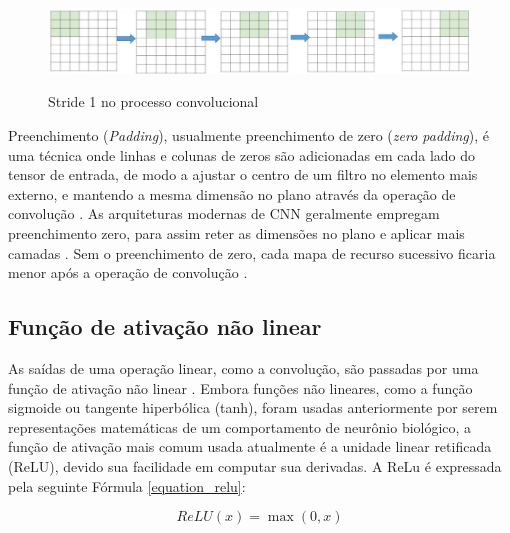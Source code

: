 \documentclass[
	12pt,				%
	oneside,			%
	a4paper,			%
	english,			%
	brazil				%
	]{abntex2ppgsi}
\begin{document}
\begin{figure}[H]
    \centering
    \caption{Stride 1 no processo convolucional}
    \includegraphics[scale=.40]{imagens/conceitos_basicos/convolution_stride_cnn.png}
    \label{fig:convolution_stride_cnn}
\end{figure}

Preenchimento (\textit{Padding}), usualmente preenchimento de zero (\textit{zero padding}), é uma técnica onde linhas e colunas de zeros são adicionadas em cada lado do tensor de entrada, de modo a ajustar o centro de um filtro no elemento mais externo, e mantendo a mesma dimensão no plano através da operação de convolução \cite{yamashita2018convolutional}. As arquiteturas modernas de CNN geralmente empregam preenchimento zero, para assim reter as dimensões no plano e aplicar mais camadas \cite{yamashita2018convolutional}. Sem o preenchimento de zero, cada mapa de recurso sucessivo ficaria menor após a operação de convolução \cite{yamashita2018convolutional}.

\subsection{Função de ativação não linear}
As saídas de uma operação linear, como a convolução, são passadas por uma função de ativação não linear \cite{albawi2017understanding}. Embora funções não lineares, como a função sigmoide ou tangente hiperbólica (tanh), foram usadas anteriormente por serem representações matemáticas de um comportamento de neurônio biológico, a função de ativação mais comum usada atualmente é a unidade linear retificada (ReLU), devido sua facilidade em computar sua derivadas. A ReLu é expressada pela seguinte Fórmula \ref{equation_relu}:

\begin{equation}
  ReLU(x)=\max(0, x)
  \label{equation_relu}
\end{equation}
\end{document}
